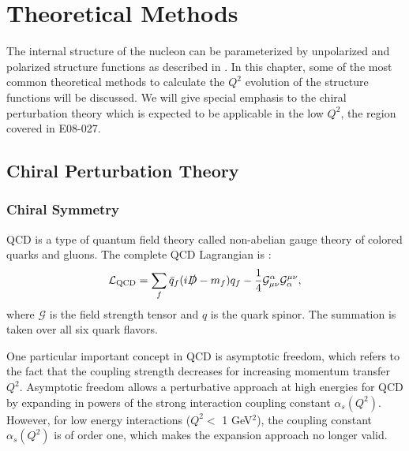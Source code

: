 
\chapter{Theoretical Methods}
\label{C3}

The internal structure of the nucleon can be parameterized by unpolarized and polarized structure functions as described in . In this chapter, some of the most common theoretical methods to calculate the $Q^2$ evolution of the structure functions will be discussed. We will give special emphasis to the chiral perturbation theory which is expected to be applicable in the low $Q^2$, the region covered in E08-027.

\section{Chiral Perturbation Theory}
\label{C3S1}

\subsection{Chiral Symmetry}
\label{C3S1SS1}

QCD is a type of quantum field theory called non-abelian gauge theory of colored quarks and gluons. The complete QCD Lagrangian is \cite{Marciano1978}:
\begin{equation} \label{C3S1SS1E1}
\mathcal{L}_{\mathrm{QCD}} = \sum_f\bar{q}_f(i\slashed{D}-m_f)q_f-\frac{1}{4}\mathcal{G}_{\mu\nu}^\alpha\mathcal{G}_\alpha^{\mu\nu},
\end{equation}
where $\mathcal{G}$ is the field strength tensor and $q$ is the quark spinor. The summation is taken over all six quark flavors.

One particular important concept in QCD is asymptotic freedom, which refers to the fact that the coupling strength decreases for increasing momentum transfer $Q^2$. Asymptotic freedom allows a perturbative approach at high energies for QCD by expanding in powers of the strong interaction coupling constant $\alpha_s(Q^2)$. However, for low energy interactions ($Q^2 <$ 1 GeV${}^2$), the coupling constant $\alpha_s(Q^2)$ is of order one, which makes the expansion approach no longer valid.


